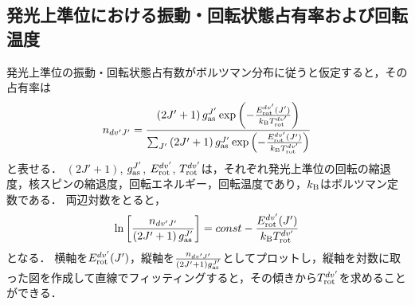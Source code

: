 \subsection{発光上準位における振動・回転状態占有率および回転温度}
発光上準位の振動・回転状態占有数がボルツマン分布に従うと仮定すると，その占有率は
\begin{equation}
    n_{dv'J'} = \frac{ \left(  2J'+1 \right) g^{J'}_{\rm as} \exp \left(-\frac{E^{dv'}_{\rm rot}(J')}{k_{\rm B} T^{dv'}_{\rm rot}} \right) }{ \sum_{J'} \left(  2J'+1 \right) g^{J'}_{\rm as} \exp \left(-\frac{E^{dv'}_{\rm rot}(J')}{k_{\rm B} T^{dv'}_{\rm rot}} \right)}
\end{equation}
と表せる．
$(2J'+1)$, $g^{J'}_{\rm as}$, $E^{dv'}_{\rm rot}$, $T^{dv'}_{\rm rot}$は，それぞれ発光上準位の回転の縮退度，核スピンの縮退度，回転エネルギー，回転温度であり，$k_{\rm B}$はボルツマン定数である．
両辺対数をとると，
\begin{equation}
    \ln \left[ \frac{n_{dv'J'}}{\left( 2J'+1 \right) g^{J'}_{\rm as}} \right]
    = const - \frac{E^{dv'}_{\rm rot}(J')}{k_{\rm B} T^{dv'}_{\rm rot}}
\end{equation}
となる．
横軸を$E^{dv'}_{\rm rot}(J')$，縦軸を$\frac{n_{dv'J'}}{\left( 2J'+1 \right) g^{J'}_{\rm as}}$としてプロットし，縦軸を対数に取った図を作成して直線でフィッティングすると，その傾きから$T^{dv'}_{\rm rot}$を求めることができる．

